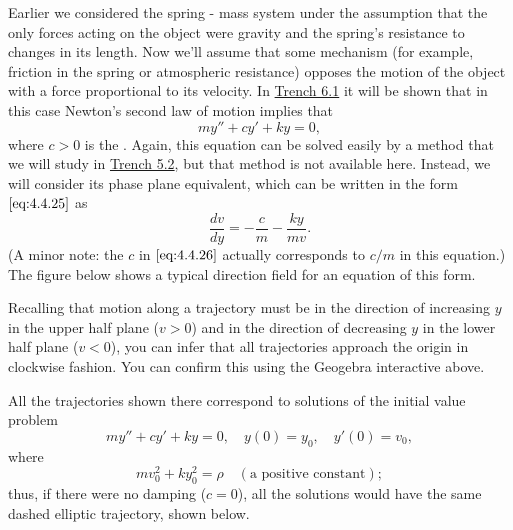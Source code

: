 \documentclass{ximera}
\begin{document}
Earlier we considered
the spring - mass system under the assumption that the only forces
acting on the object were gravity and the spring's resistance to
changes in its length. Now we'll assume that some mechanism (for
example, friction in the spring or atmospheric resistance) opposes the
motion of the object with a force proportional to its velocity. In \href{https://xerxes.ximera.org/differentialequations/main/springProblemsI/springProblemsI}{Trench 6.1} it will be shown that in this case Newton's
second law of motion implies that
\begin{equation}\label{eq:4.4.27}
my''+cy'+ky=0,
\end{equation}
where $c>0$ is the . Again, this
equation can
be solved easily by a method that we will study in \href{https://xerxes.ximera.org/differentialequations/main/constantCoefficientHomogeneousEquations/constantCoefficientHomogeneousEquations}{Trench 5.2},
but that method is not available here. Instead, we will consider its phase plane equivalent, which can be written in the form $\eqref{eq:4.4.25}$
as
\begin{equation}\label{eq:4.4.28}
\frac{dv}{dy}=-\frac{c}{m}-\frac{ky}{mv}.
\end{equation}
(A minor note: the $c$ in $\eqref{eq:4.4.26}$ actually corresponds to
$c/m$ in this equation.) The figure below shows a
typical direction field for an equation of this form.


\begin{center}
\end{center}

 
 
Recalling that
motion along a trajectory must be in the direction of increasing $y$
in the upper half plane ($v>0$) and in the direction of decreasing $y$
in the lower half plane ($v<0$), you can infer that all trajectories
approach the origin in clockwise fashion. You can confirm this using the Geogebra interactive above.

 
 
 
All the trajectories shown there correspond to
solutions of the initial value problem
$$
my''+cy'+ky=0,\quad y(0)=y_0,\quad y'(0)=v_0,
$$
where
$$
mv_0^2+ky_0^2=\rho\quad (\mbox{a positive constant});
$$
thus, if there were no damping ($c=0$),  all the solutions would
have the same dashed elliptic trajectory, shown below.
\end{document}
